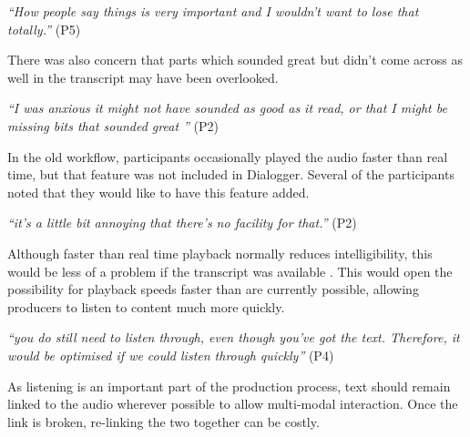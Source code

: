 \textit{``How people say things is very important and I wouldn't want to lose
  that totally.''} (P5)

There was also concern that parts which sounded great but didn't come across
as well in the transcript may have been overlooked.

\textit{``I was anxious it might not have sounded as good as it read, or that I
  might be missing bits that sounded great ''} (P2)

In the old workflow, participants occasionally played the audio faster than
real time, but that feature was not included in Dialogger.
Several of the participants noted that they would like to have this
feature added.

\textit{``it's a little bit annoying that there's no facility for that.''}
(P2)

Although faster than real time playback normally reduces intelligibility, this
would be less of a problem if the transcript was available \citep{Ranjan2006}.
This would open the possibility for playback speeds faster than are currently
possible, allowing producers to listen to content much more quickly.

\textit{``you do still need to listen through, even though you've got the text.
Therefore, it would be optimised if we could listen through quickly''}
(P4)

As listening is an important part of the production process, text should remain
linked to the audio wherever possible to allow multi-modal interaction. Once
the link is broken, re-linking the two together can be costly.




